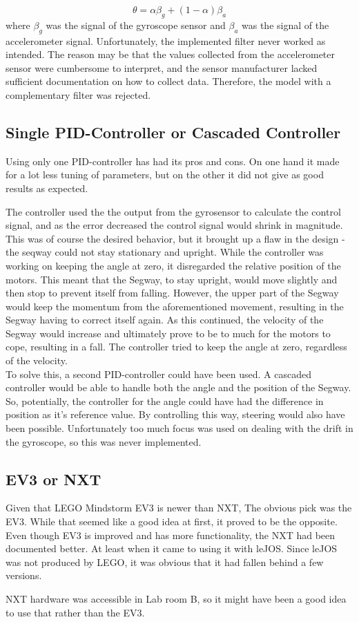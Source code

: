 \begin{displaymath}
\theta = \alpha \beta_{g} + (1-\alpha)\beta_{a}
\end{displaymath}
where $\beta_g$ was the signal of the gyroscope sensor and $\beta_a$ was the signal of the accelerometer signal. Unfortunately, the implemented filter never worked as intended. The reason may be that the values collected from the accelerometer sensor were cumbersome to interpret, and the sensor manufacturer lacked sufficient documentation on how to collect data. Therefore, the model with a complementary filter was rejected.

\subsection{Single PID-Controller or Cascaded Controller}
Using only one PID-controller has had its pros and cons. On one hand it made for a lot less tuning of parameters, but on the other it did not give as good results as expected.

The controller used the the output from the gyrosensor to calculate the control signal, and as the error decreased the control signal would shrink in magnitude. This was of course the desired behavior, but it brought up a flaw in the design - the seqway could not stay stationary and upright. While the controller was working on keeping the angle at zero, it disregarded the relative position of the motors. This meant that the Segway, to stay upright, would move slightly and then stop to prevent itself from falling. However, the upper part of the Segway would keep the momentum from the aforementioned movement, resulting in the Segway having to correct itself again. As this continued, the velocity of the Segway would increase and ultimately prove to be to much for the motors to cope, resulting in a fall. The controller tried to keep the angle at zero, regardless of the velocity.
\\[3ex]
To solve this, a second PID-controller could have been used. A cascaded controller would be able to handle both the angle and the position of the Segway. So, potentially, the controller for the angle could have had the difference in position as it's reference value. By controlling this way, steering would also have been possible. Unfortunately too much focus was used on dealing with the drift in the gyroscope, so this was never implemented.


\subsection{EV3 or NXT}
Given that LEGO Mindstorm EV3 is newer than NXT, The obvious pick was the EV3. While that seemed like a good idea at first, it proved to be the opposite. Even though EV3 is improved and has more functionality, the NXT had been documented better. At least when it came to using it with leJOS. Since leJOS was not produced by LEGO, it was obvious that it had fallen behind a few versions.

NXT hardware was accessible in Lab room B, so it might have been a good idea to use that rather than the EV3.

\newpage


\theendnotes
